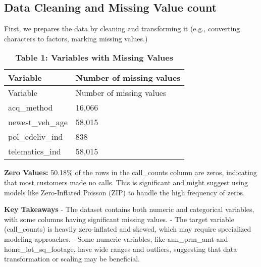 \documentclass[
  10pt,
  letterpaper,
  twocolumn]{article}
\begin{document}
\hypertarget{data-cleaning-and-missing-value-count}{%
\subsection{Data Cleaning and Missing Value
count}\label{data-cleaning-and-missing-value-count}}

First, we prepares the data by cleaning and transforming it (e.g.,
converting characters to factors, marking missing values.)

\begin{longtable}[]{@{}ll@{}}
\caption{\textbf{Table 1: Variables with Missing Values}}\tabularnewline
\toprule\noalign{}
Variable & Number of missing values \\
\midrule\noalign{}
\endfirsthead
\toprule\noalign{}
Variable & Number of missing values \\
\midrule\noalign{}
\endhead
\bottomrule\noalign{}
\endlastfoot
acq\_method & 16,066 \\
newest\_veh\_age & 58,015 \\
pol\_edeliv\_ind & 838 \\
telematics\_ind & 58,015 \\
\end{longtable}

\textbf{Zero Values:} 50.18\% of the rows in the call\_counts column are
zeros, indicating that most customers made no calls. This is significant
and might suggest using models like Zero-Inflated Poisson (ZIP) to
handle the high frequency of zeros.

\textbf{Key Takeaways} - The dataset contains both numeric and
categorical variables, with some columns having significant missing
values. - The target variable (call\_counts) is heavily zero-inflated
and skewed, which may require specialized modeling approaches. - Some
numeric variables, like ann\_prm\_amt and home\_lot\_sq\_footage, have
wide ranges and outliers, suggesting that data transformation or scaling
may be beneficial.


\end{document}
